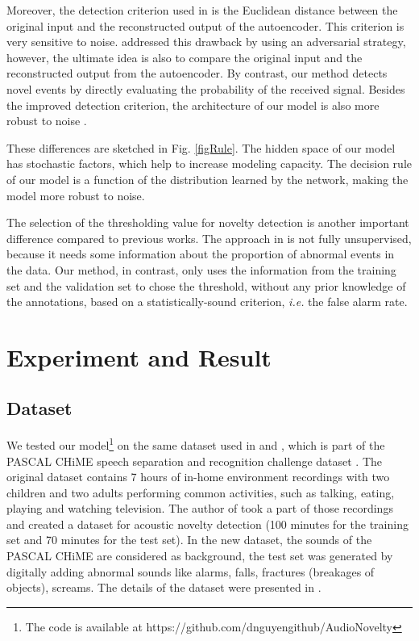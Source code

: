 \documentclass{article}
\begin{document}
Moreover, the detection criterion used in \cite{marchi_novel_2015} is the Euclidean distance between the original input and the reconstructed output of the autoencoder. This criterion is very sensitive to noise. 
\cite{principi_acoustic_2017} addressed this drawback by using an adversarial strategy, however, the ultimate idea is also to compare the original input and the reconstructed output from the autoencoder. By contrast, our method detects novel events by directly evaluating the probability of the received signal. Besides the improved detection criterion, the architecture of our model is also more robust to noise \cite{nguyen_multi-task_2018}.  


These differences are sketched in Fig. \ref{figRule}. The hidden space of our model has stochastic factors, which help to increase modeling capacity. The decision rule of our model is a function of the distribution learned by the network, making the model more robust to noise. 

The selection of the thresholding value for novelty detection is another important difference compared to previous works. 
The approach in \cite{marchi_novel_2015} is not fully unsupervised, because it needs some information about the proportion of abnormal events in the data. 
Our method, in contrast, only uses the information from the training set and the validation set to chose the threshold, without any prior knowledge of the annotations, based on a statistically-sound criterion, {\em i.e.} the false alarm rate. 



%
 \section{Experiment and Result}
\label{secExperimentResult}

\subsection{Dataset}
\label{secDataset}

We tested our model\footnote{The code is available at https://github.com/dnguyengithub/AudioNovelty} on the same dataset used in \cite{marchi_novel_2015} and \cite{principi_acoustic_2017}, which is part of the PASCAL CHiME speech separation and recognition challenge dataset \cite{barker_pascal_2013}. The original dataset contains 7 hours of in-home environment recordings with two children and two adults performing common activities, such as talking, eating, playing and watching television. The author of \cite{marchi_novel_2015} took a part of those recordings and created a dataset for acoustic novelty detection (100 minutes for the training set and 70 minutes for the test set). In the new dataset, the sounds of the PASCAL CHiME are considered as background, the test set was generated by digitally adding abnormal sounds like alarms, falls, fractures (breakages of objects), screams. The details of the dataset were presented in \cite{marchi_novel_2015}.
\end{document}
